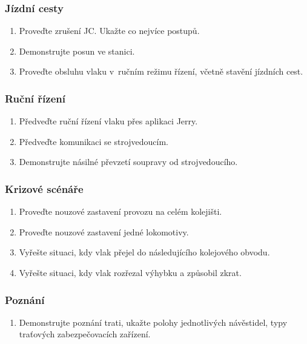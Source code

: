 \documentclass[12pt,a4paper]{article}
\def\solution#1{\ifsolution \par\vskip-\parskip{\color{gray}#1}\fi}
\begin{document}
\subsubsection*{Jízdní cesty}
\begin{enumerate}[leftmargin=*]
\item Proveďte zrušení JC. Ukažte co nejvíce postupů.

\item Demonstrujte posun ve stanici.

\item Proveďte obsluhu vlaku v~ručním režimu řízení, včetně stavění jízdních
cest.
\end{enumerate}

\subsubsection*{Ruční řízení}
\begin{enumerate}[leftmargin=*]
\item Předveďte ruční řízení vlaku přes aplikaci Jerry.
\item Předveďte komunikaci se strojvedoucím.
\item Demonstrujte násilné převzetí soupravy od strojvedoucího.
\end{enumerate}

\subsubsection*{Krizové scénáře}
\begin{enumerate}[leftmargin=*]
\item Proveďte nouzové zastavení provozu na celém kolejišti.
\item Proveďte nouzové zastavení jedné lokomotivy.
\item Vyřešte situaci, kdy vlak přejel do následujícího kolejového obvodu.
\item Vyřešte situaci, kdy vlak rozřezal výhybku a způsobil zkrat.
\end{enumerate}

\subsubsection*{Poznání}
\begin{enumerate}[leftmargin=*]
\item Demonstrujte poznání trati, ukažte polohy jednotlivých návěstidel, typy
traťových zabezpečovacích zařízení.
\end{enumerate}
\end{document}
